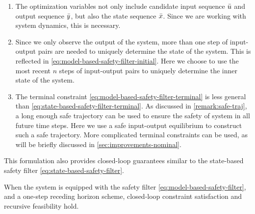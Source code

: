 \begin{enumerate}
    \item The optimization variables not only include candidate input sequence $\bar{u}$ and output sequence $\bar{y}$, but also the state sequence $\bar{x}$.
    Since we are working with system dynamics, this is necessary.
    \item Since we only observe the output of the system, more than one step of input-output pairs are needed to uniquely determine the state of the system.
    This is reflected in \cref{eq:model-based-safety-filter-initial}.
    Here we choose to use the most recent $n$ steps of input-output pairs to uniquely determine the inner state of the system.
    \item The terminal constraint \cref{eq:model-based-safety-filter-terminal} is less general than \cref{eq:state-based-safety-filter-terminal}.
    As discussed in \cref{remark:safe-traj}, a long enough safe trajectory can be used to ensure the safety of system in all future time steps.
    Here we use a safe input-output equilibrium to construct such a safe trajectory.
    More complicated terminal constraints can be used, as will be briefly discussed in \cref{sec:improvements-nominal}.
\end{enumerate}

This formulation also provides closed-loop guarantees similar to the state-based safety filter \cref{eq:state-based-safety-filter}.

\begin{theorem}\label{thm:guarantee-model-based-lti}
    When the system is equipped with the safety filter \cref{eq:model-based-safety-filter}, and a one-step receding horizon scheme, closed-loop constraint satisfaction and recursive feasibility hold.
\end{theorem}


